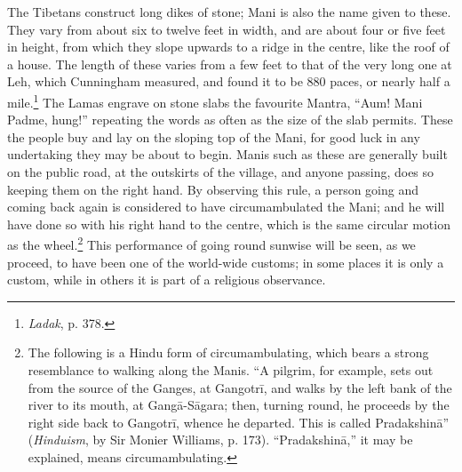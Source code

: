 \documentclass[a4paper, 11pt, oneside, polutonikogreek, english]{article}
\begin{document}
The Tibetans construct long dikes of stone; Mani is also the name given to these. They vary from about six to twelve feet in width, and are about four or five feet in height, from which they slope upwards to a ridge in the centre, like the roof of a house. The length of these varies from a few feet to that of the very long one at Leh, which Cunningham measured, and found it to be 880 paces, or nearly half a mile.\footnote{\emph{Ladak}, p. 378.} The Lamas engrave on stone slabs the favourite Mantra, ``Aum! Mani Padme, hung!'' repeating the words as often as the size of the slab permits. These the people buy and lay on the sloping top of the Mani, for good luck in any undertaking they may be about to begin. Manis such as these are generally built on the public road, at the outskirts of the village, and anyone passing, does so keeping them on the right hand. By observing this rule, a person going and coming back again is considered to have circumambulated the Mani; and he will have done so with his right hand to the centre, which is the same circular motion as the wheel.\footnote{The following is a Hindu form of circumambulating, which bears a strong resemblance to walking along the Manis. ``A pilgrim, for example, sets out from the source of the Ganges, at Gangotrī, and walks by the left bank of the river to its mouth, at Gangā-Sāgara; then, turning round, he proceeds by the right side back to Gangotrī, whence he departed. This is called Pradakshinā'' (\emph{Hinduism}, by Sir Monier Williams, p. 173). ``Pradakshinā,'' it may be explained, means circumambulating.} This performance of going round sunwise will be seen, as we proceed, to have been one of the world-wide customs; in some places it is only a custom, while in others it is part of a religious observance.
\end{document}
